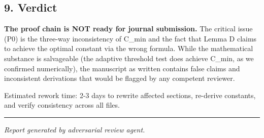 \documentclass[
  12pt,
]{article}
\begin{document}
\subsection{9. Verdict}\label{verdict}

\textbf{The proof chain is NOT ready for journal submission.} The
critical issue (P0) is the three-way inconsistency of C\_min and the
fact that Lemma D claims to achieve the optimal constant via the wrong
formula. While the mathematical substance is salvageable (the adaptive
threshold test does achieve C\_min, as we confirmed numerically), the
manuscript as written contains false claims and inconsistent derivations
that would be flagged by any competent reviewer.

Estimated rework time: 2-3 days to rewrite affected sections, re-derive
constants, and verify consistency across all files.

\begin{center}\rule{0.5\linewidth}{0.5pt}\end{center}

\emph{Report generated by adversarial review agent.}
\end{document}
